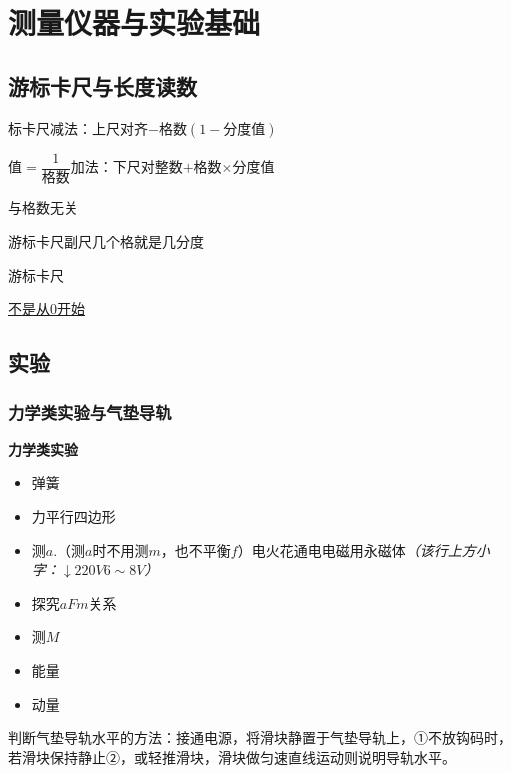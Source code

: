 \chapter{测量仪器与实验基础}
\label{ch:18}

\section{游标卡尺与长度读数}
标卡尺\quad 减法：上尺对齐$-$格数$(1-\text{分度值})$ %

值$=\dfrac{1}{\text{格数}}$\quad 加法：下尺对整数$+$格数$\times$分度值 %

与格数无关 %

游标卡尺副尺几个格就是几分度 %

游标卡尺

\underline{不是从0开始}


\section{实验}
\subsection{力学类实验与气垫导轨}
\textbf{力学类实验}
\begin{itemize}
\item 弹簧
\item 力平行四边形
\item 测$a$.（测$a$时不用测$m$，也不平衡$f$）\quad 电火花通电\quad 电磁用永磁体\quad\textit{（该行上方小字：$\downarrow$\quad $220\unit{V}$\quad $6\sim8\unit{V}$）}
\item 探究$aFm$关系
\item 测$M$
\item 能量
\item 动量
\end{itemize}

判断气垫导轨水平的方法：接通电源，将滑块静置于气垫导轨上，①不放钩码时，若滑块保持静止②，或轻推滑块，滑块做匀速直线运动则说明导轨水平。 %

